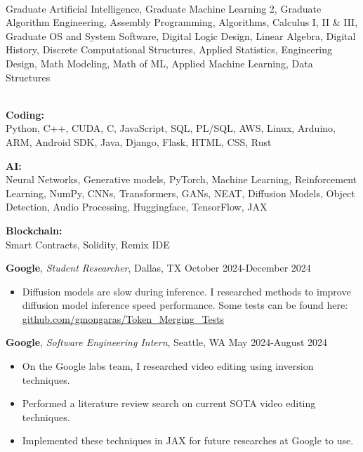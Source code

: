 \documentclass[a4paper,10pt]{article}
\begin{document}
\vspace{5pt}
 \\
Graduate Artificial Intelligence, Graduate Machine Learning 2, Graduate Algorithm Engineering, Assembly Programming, Algorithms, Calculus I, II \& III, Graduate OS and System Software, Digital Logic Design, Linear Algebra, Digital History, Discrete Computational Structures, Applied Statistics, Engineering Design, Math Modeling, Math of ML, Applied Machine Learning, Data Structures


\vspace{5pt}
 \vspace{1pt} \\
\textbf{Coding:} \\ Python, C++, CUDA, C, JavaScript, SQL, PL/SQL, AWS, Linux, Arduino, ARM, Android SDK, Java, Django, Flask, HTML, CSS, Rust

\noindent\textbf{AI:} \\ Neural Networks, Generative models, PyTorch, Machine Learning, Reinforcement Learning, NumPy, CNNs, Transformers, GANs, NEAT, Diffusion Models, Object Detection, Audio Processing, Huggingface, TensorFlow, JAX

\noindent\textbf{Blockchain:} \\ Smart Contracts, Solidity, Remix IDE






\vspace{5pt}
 \vspace{1pt}

\noindent\textbf{Google}, \textit{Student Researcher}, Dallas, TX \hfill October 2024-December 2024
\begin{itemize}[noitemsep,topsep=0pt]
  \item Diffusion models are slow during inference. I researched methods to improve diffusion model inference speed performance. Some tests can be found here: \href{https://github.com/gmongaras/Token_Merging_Tests}{github.com/gmongaras/Token\_Merging\_Tests}
\end{itemize}

\noindent\textbf{Google}, \textit{Software Engineering Intern}, Seattle, WA \hfill May 2024-August 2024
\begin{itemize}[noitemsep,topsep=0pt]
  \item On the Google labs team, I researched video editing using inversion techniques.
  \item Performed a literature review search on current SOTA video editing techniques.
  \item Implemented these techniques in JAX for future researches at Google to use.
\end{itemize}
\end{document}
